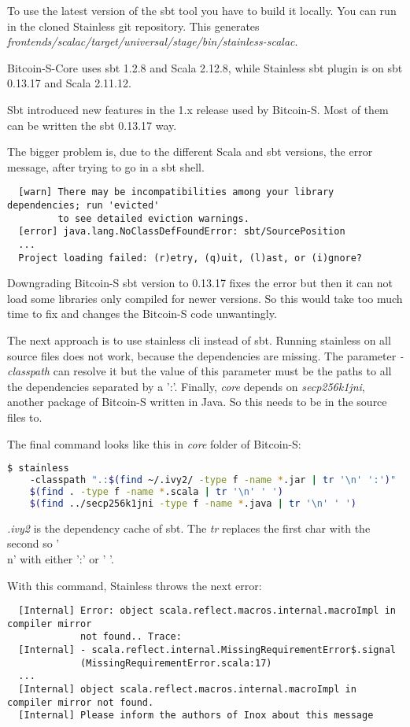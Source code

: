 To use the latest version of the sbt tool you have to build it locally.
You can run  in the cloned Stainless git repository.
This generates \emph{frontends/scalac/target/universal/stage/bin/stainless-scalac}.

Bitcoin-S-Core uses sbt 1.2.8 and Scala 2.12.8, while Stainless sbt plugin is on sbt 0.13.17 and Scala 2.11.12.

Sbt introduced new features in the 1.x release used by Bitcoin-S.
Most of them can be written the sbt 0.13.17 way.

The bigger problem is, due to the different Scala and sbt versions, the error message, after trying to go in a sbt shell.
\begin{verbatim}
  [warn] There may be incompatibilities among your library dependencies; run 'evicted'
         to see detailed eviction warnings.
  [error] java.lang.NoClassDefFoundError: sbt/SourcePosition
  ...
  Project loading failed: (r)etry, (q)uit, (l)ast, or (i)gnore?
\end{verbatim}

Downgrading Bitcoin-S sbt version to 0.13.17 fixes the error but then it can not load some libraries only compiled for newer versions.
So this would take too much time to fix and changes the Bitcoin-S code unwantingly.

The next approach is to use stainless cli instead of sbt.
Running stainless on all source files does not work, because the dependencies are missing.
The parameter \emph{-classpath} can resolve it but the value of this parameter must be the paths to all the dependencies separated by a ':'.
Finally, \emph{core} depends on \emph{secp256k1jni}, another package of Bitcoin-S written in Java.
So this needs to be in the source files to.

The final command looks like this in \emph{core} folder of Bitcoin-S:
\begin{lstlisting}[language=bash]
  $ stainless
    -classpath ".:$(find ~/.ivy2/ -type f -name *.jar | tr '\n' ':')"
    $(find . -type f -name *.scala | tr '\n' ' ')
    $(find ../secp256k1jni -type f -name *.java | tr '\n' ' ')
\end{lstlisting}

\emph{.ivy2} is the dependency cache of sbt.
The \emph{tr} replaces the first char with the second so '\\n' with either ':' or ' '.

With this command, Stainless throws the next error:
\begin{verbatim}
  [Internal] Error: object scala.reflect.macros.internal.macroImpl in compiler mirror
             not found.. Trace:
  [Internal] - scala.reflect.internal.MissingRequirementError$.signal
             (MissingRequirementError.scala:17)
  ...
  [Internal] object scala.reflect.macros.internal.macroImpl in compiler mirror not found.
  [Internal] Please inform the authors of Inox about this message
\end{verbatim}

